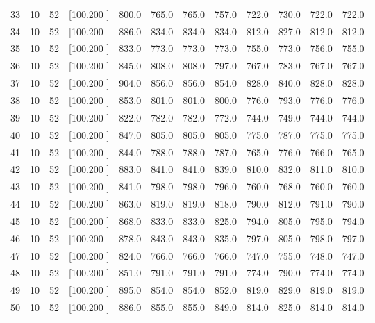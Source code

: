 \documentclass[12pt,a4paper]{article}
\begin{document}
\begin{center}
{\begin{tabular}{r r r r r r r r r r r r}
  33& 10& 52&[100.200   ]&   800.0&   765.0&   765.0&   757.0&   722.0&   730.0&   722.0&   722.0\\[-0.02in]
  34& 10& 52&[100.200   ]&   886.0&   834.0&   834.0&   834.0&   812.0&   827.0&   812.0&   812.0\\[-0.02in]
  35& 10& 52&[100.200   ]&   833.0&   773.0&   773.0&   773.0&   755.0&   773.0&   756.0&   755.0\\[-0.02in]
  36& 10& 52&[100.200   ]&   845.0&   808.0&   808.0&   797.0&   767.0&   783.0&   767.0&   767.0\\[-0.02in]
  37& 10& 52&[100.200   ]&   904.0&   856.0&   856.0&   854.0&   828.0&   840.0&   828.0&   828.0\\[-0.02in]
  38& 10& 52&[100.200   ]&   853.0&   801.0&   801.0&   800.0&   776.0&   793.0&   776.0&   776.0\\[-0.02in]
  39& 10& 52&[100.200   ]&   822.0&   782.0&   782.0&   772.0&   744.0&   749.0&   744.0&   744.0\\[-0.02in]
  40& 10& 52&[100.200   ]&   847.0&   805.0&   805.0&   805.0&   775.0&   787.0&   775.0&   775.0\\[-0.02in]
  41& 10& 52&[100.200   ]&   844.0&   788.0&   788.0&   787.0&   765.0&   776.0&   766.0&   765.0\\[-0.02in]
  42& 10& 52&[100.200   ]&   883.0&   841.0&   841.0&   839.0&   810.0&   832.0&   811.0&   810.0\\[-0.02in]
  43& 10& 52&[100.200   ]&   841.0&   798.0&   798.0&   796.0&   760.0&   768.0&   760.0&   760.0\\[-0.02in]
  44& 10& 52&[100.200   ]&   863.0&   819.0&   819.0&   818.0&   790.0&   812.0&   791.0&   790.0\\[-0.02in]
  45& 10& 52&[100.200   ]&   868.0&   833.0&   833.0&   825.0&   794.0&   805.0&   795.0&   794.0\\[-0.02in]
  46& 10& 52&[100.200   ]&   878.0&   843.0&   843.0&   835.0&   797.0&   805.0&   798.0&   797.0\\[-0.02in]
  47& 10& 52&[100.200   ]&   824.0&   766.0&   766.0&   766.0&   747.0&   755.0&   748.0&   747.0\\[-0.02in]
  48& 10& 52&[100.200   ]&   851.0&   791.0&   791.0&   791.0&   774.0&   790.0&   774.0&   774.0\\[-0.02in]
  49& 10& 52&[100.200   ]&   895.0&   854.0&   854.0&   852.0&   819.0&   829.0&   819.0&   819.0\\[-0.02in]
  50& 10& 52&[100.200   ]&   886.0&   855.0&   855.0&   849.0&   814.0&   825.0&   814.0&   814.0\\[-0.02in]

\end{tabular}}
\end{center}
\end{document}
